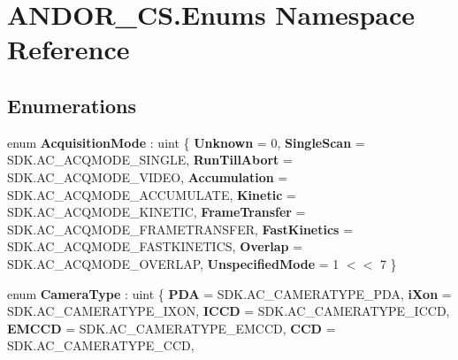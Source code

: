 \hypertarget{namespace_a_n_d_o_r___c_s_1_1_enums}{}\section{A\+N\+D\+O\+R\+\_\+\+C\+S.\+Enums Namespace Reference}
\label{namespace_a_n_d_o_r___c_s_1_1_enums}
\subsection*{Enumerations}
\begin{DoxyCompactItemize}
\item 
\mbox{\label{namespace_a_n_d_o_r___c_s_1_1_enums_a219058997f5c737de53c8607c5f11be8}} 
enum {\bfseries Acquisition\+Mode} \+: uint \{ \newline
{\bfseries Unknown} = 0, 
{\bfseries Single\+Scan} = S\+D\+K.\+A\+C\+\_\+\+A\+C\+Q\+M\+O\+D\+E\+\_\+\+S\+I\+N\+G\+LE, 
{\bfseries Run\+Till\+Abort} = S\+D\+K.\+A\+C\+\_\+\+A\+C\+Q\+M\+O\+D\+E\+\_\+\+V\+I\+D\+EO, 
{\bfseries Accumulation} = S\+D\+K.\+A\+C\+\_\+\+A\+C\+Q\+M\+O\+D\+E\+\_\+\+A\+C\+C\+U\+M\+U\+L\+A\+TE, 
\newline
{\bfseries Kinetic} = S\+D\+K.\+A\+C\+\_\+\+A\+C\+Q\+M\+O\+D\+E\+\_\+\+K\+I\+N\+E\+T\+IC, 
{\bfseries Frame\+Transfer} = S\+D\+K.\+A\+C\+\_\+\+A\+C\+Q\+M\+O\+D\+E\+\_\+\+F\+R\+A\+M\+E\+T\+R\+A\+N\+S\+F\+ER, 
{\bfseries Fast\+Kinetics} = S\+D\+K.\+A\+C\+\_\+\+A\+C\+Q\+M\+O\+D\+E\+\_\+\+F\+A\+S\+T\+K\+I\+N\+E\+T\+I\+CS, 
{\bfseries Overlap} = S\+D\+K.\+A\+C\+\_\+\+A\+C\+Q\+M\+O\+D\+E\+\_\+\+O\+V\+E\+R\+L\+AP, 
\newline
{\bfseries Unspecified\+Mode} = 1 $<$$<$ 7
 \}
\item 
\mbox{\label{namespace_a_n_d_o_r___c_s_1_1_enums_ae162c7cc25250103995589a3208bd171}} 
enum {\bfseries Camera\+Type} \+: uint \{ \newline
{\bfseries P\+DA} = S\+D\+K.\+A\+C\+\_\+\+C\+A\+M\+E\+R\+A\+T\+Y\+P\+E\+\_\+\+P\+DA, 
{\bfseries i\+Xon} = S\+D\+K.\+A\+C\+\_\+\+C\+A\+M\+E\+R\+A\+T\+Y\+P\+E\+\_\+\+I\+X\+ON, 
{\bfseries I\+C\+CD} = S\+D\+K.\+A\+C\+\_\+\+C\+A\+M\+E\+R\+A\+T\+Y\+P\+E\+\_\+\+I\+C\+CD, 
{\bfseries E\+M\+C\+CD} = S\+D\+K.\+A\+C\+\_\+\+C\+A\+M\+E\+R\+A\+T\+Y\+P\+E\+\_\+\+E\+M\+C\+CD, 
\newline
{\bfseries C\+CD} = S\+D\+K.\+A\+C\+\_\+\+C\+A\+M\+E\+R\+A\+T\+Y\+P\+E\+\_\+\+C\+CD, 
$$
\end{DoxyCompactItemize}
